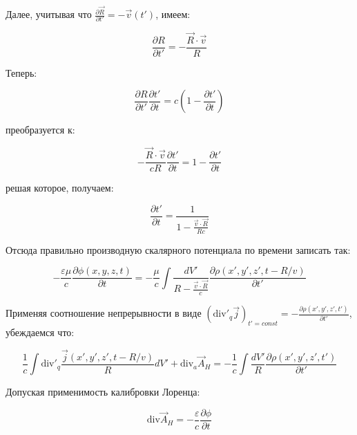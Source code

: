 \documentclass[12pt, a4paper]{article}
\begin{document}
Далее, учитывая что $\frac{\partial \vec{R}}{\partial t'} = -\vec{v}(t')$, имеем:

\begin{equation}
\frac{\partial R}{\partial t'} = -\frac{\vec{R} \cdot \vec{v}}{R}
\label{eq:R_t_prime_final}
\end{equation}

Теперь:

\begin{equation}
\frac{\partial R}{\partial t'} \frac{\partial t'}{\partial t} = c \left( 1 - \frac{\partial t'}{\partial t} \right)
\label{eq:chain_rule}
\end{equation}

преобразуется к:

\begin{equation}
-\frac{\vec{R} \cdot \vec{v}}{cR} \frac{\partial t'}{\partial t} = 1 - \frac{\partial t'}{\partial t}
\label{eq:chain_rule_expanded}
\end{equation}

решая которое, получаем:

\begin{equation}
\frac{\partial t'}{\partial t} = \frac{1}{1 - \frac{\vec{v} \cdot \vec{R}}{Rc}}
\label{eq:t_prime_final}
\end{equation}

Отсюда правильно производную скалярного потенциала по времени записать так:

\begin{equation}
-\frac{\varepsilon \mu}{c} \frac{\partial \phi(x, y, z, t)}{\partial t} = -\frac{\mu}{c} \int \frac{dV'}{R - \frac{\vec{v} \cdot \vec{R}}{c}} \frac{\partial \rho(x', y', z', t - R/v)}{\partial t'}
\label{eq:phi_derivative_correct}
\end{equation}

Применяя соотношение непрерывности в виде $(\text{div}'_q \vec{j})_{t'=const} = -\frac{\partial \rho(x', y', z', t')}{\partial t'}$, убеждаемся что:

\begin{equation}
\frac{1}{c} \int \text{div}'_q \frac{\vec{j}(x', y', z', t - R/v)}{R} dV' + \text{div}_a \vec{A}_H = -\frac{1}{c} \int \frac{dV'}{R} \frac{\partial \rho(x', y', z', t')}{\partial t'}
\label{eq:continuity_relation}
\end{equation}

Допуская применимость калибровки Лоренца:

\begin{equation}
\text{div} \vec{A}_H = -\frac{\varepsilon}{c} \frac{\partial \phi}{\partial t}
\label{eq:lorentz_assumption}
\end{equation}
\end{document}
